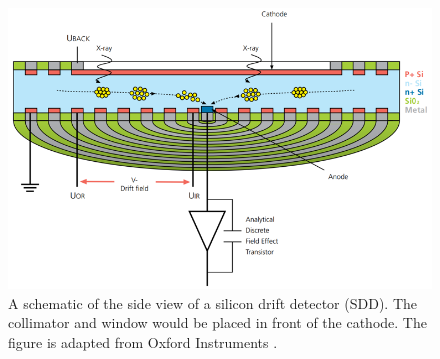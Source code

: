 \begin{figure}[pht]
    \centering
    \includegraphics[width=0.89\linewidth]{figures/EDS_SDD.png}
    \caption{
        A schematic of the side view of a silicon drift detector (SDD).
        The collimator and window would be placed in front of the cathode.
        The figure is adapted from Oxford Instruments \cite{oxford_sdd_explained}.
    }
    \label{fig:eds_sdd}
\end{figure}




